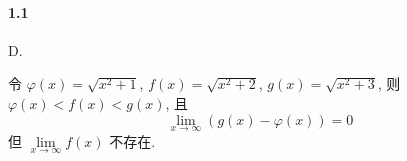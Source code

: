
\paragraph{1.1}

D. 

令 $\varphi(x)=\sqrt{x^2+1}$, $f(x)=\sqrt{x^2+2}$, $g(x)=\sqrt{x^2+3}$, 则 $\varphi(x)<f(x)<g(x)$, 且
\[
	\lim_{x\to\infty}\left(g(x)-\varphi(x)\right)=0
\]
但 $\lim\limits_{x\to\infty}f(x)$ 不存在.